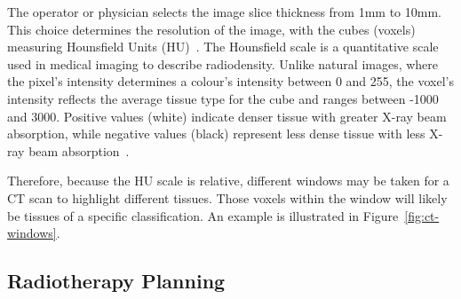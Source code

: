 \documentclass[11pt,twoside]{report}
\begin{document}
The operator or physician selects the image slice thickness from 1mm to 10mm. This choice determines the resolution of the image, with the cubes (voxels) measuring Hounsfield Units (HU)~\cite{diagnostic-radiology-physics}. The Hounsfield scale is a quantitative scale used in medical imaging to describe radiodensity. Unlike natural images, where the pixel's intensity determines a colour's intensity between 0 and 255, the voxel's intensity reflects the average tissue type for the cube and ranges between -1000 and 3000. Positive values (white) indicate denser tissue with greater X-ray beam absorption, while negative values (black) represent less dense tissue with less X-ray beam absorption~\cite{Statpearls}.

Therefore, because the HU scale is relative, different windows may be taken for a CT scan to highlight different tissues. Those voxels within the window will likely be tissues of a specific classification. An example is illustrated in Figure~\ref{fig:ct-windows}.

\subsection{Radiotherapy Planning}\label{sect:radiotherapy-planning}
\end{document}
